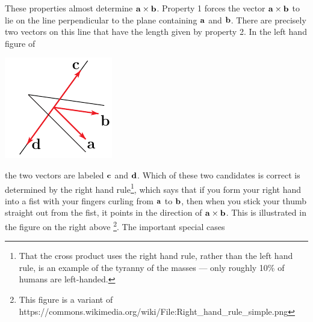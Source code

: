 \noindent
These properties almost determine $\mathbf{a}\times\mathbf{b}$. Property 1 forces
the vector $\mathbf{a}\times\mathbf{b}$ to lie on the line perpendicular to the
plane containing $\mathbf{a}$ and $\mathbf{b}$. There are precisely two vectors
on this line that have the length given by property 2. In the left hand
figure of
      \begin{efig} 
      \begin{center}
      \includegraphics{crossLL.pdf}\qquad\quad
      \qquad\quad
      \end{center}
      \end{efig}
the two vectors are labeled $\mathbf{c}$ and $\mathbf{d}$. Which of these two
candidates is correct is determined by the right hand rule\footnote{
That the cross product uses the right hand rule, rather than the left hand rule, is an example of the tyranny of the masses --- only roughly 10\% 
of humans are left-handed. }, which says
that if you form your right hand into a fist with your fingers curling from 
$\mathbf{a}$ to $\mathbf{b}$, then when you stick your thumb straight out from
the fist, it points in the direction of $\mathbf{a}\times\mathbf{b}$. This is
illustrated in the figure on the right 
above
\footnote{This figure is a variant of 
https:/\hskip-1pt/commons.wikimedia.org/wiki/File:Right\_hand\_rule\_simple.png
}.
The important special cases

